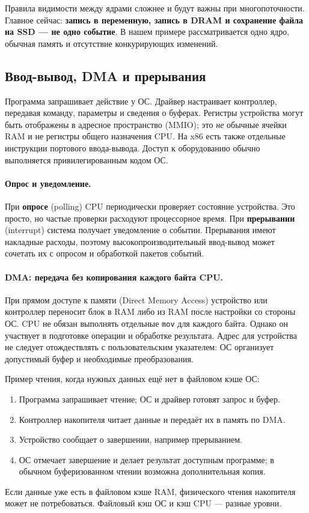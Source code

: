 Правила видимости между ядрами сложнее и будут важны при многопоточности.
Главное сейчас: \textbf{запись в переменную, запись в DRAM и сохранение файла
на SSD --- не одно событие}. В нашем примере рассматривается одно ядро,
обычная память и отсутствие конкурирующих изменений.

\subsection{Ввод-вывод, DMA и прерывания}
\label{lecture04-interrupts}
Программа запрашивает действие у ОС. Драйвер настраивает контроллер,
передавая команду, параметры и сведения о буферах. Регистры устройства
могут быть отображены в адресное пространство (MMIO); это \emph{не}
обычные ячейки RAM и не регистры общего назначения CPU. На x86 есть
также отдельные инструкции портового ввода-вывода. Доступ к оборудованию
обычно выполняется привилегированным кодом ОС.

\paragraph{Опрос и уведомление.}
При \textbf{опросе} (polling) CPU периодически проверяет состояние устройства.
Это просто, но частые проверки расходуют процессорное время. При
\textbf{прерывании} (interrupt) система получает уведомление о событии.
Прерывания имеют накладные расходы, поэтому высокопроизводительный
ввод-вывод может сочетать их с опросом и обработкой пакетов событий.

\paragraph{DMA: передача без копирования каждого байта CPU.}
При прямом доступе к памяти (Direct Memory Access) устройство или
контроллер переносит блок в RAM либо из RAM после настройки со стороны
ОС. CPU не обязан выполнять отдельные \texttt{mov} для каждого байта.
Однако он участвует в подготовке операции и обработке результата.
Адрес для устройства не следует отождествлять с пользовательским указателем:
ОС организует допустимый буфер и необходимые преобразования.

Пример чтения, когда нужных данных ещё нет в файловом кэше ОС:
\begin{enumerate}
\item Программа запрашивает чтение; ОС и драйвер готовят запрос и буфер.
\item Контроллер накопителя читает данные и передаёт их в память по DMA.
\item Устройство сообщает о завершении, например прерыванием.
\item ОС отмечает завершение и делает результат доступным программе;
      в обычном буферизованном чтении возможна дополнительная копия.
\end{enumerate}
Если данные уже есть в файловом кэше RAM, физического чтения накопителя
может не потребоваться. Файловый кэш ОС и кэш CPU --- разные уровни.

